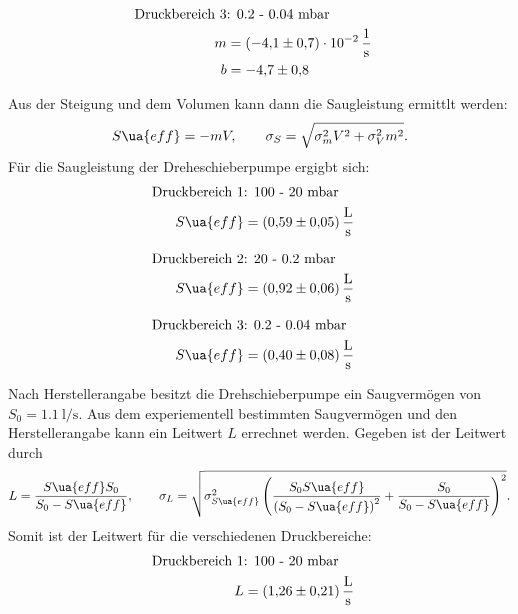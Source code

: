 \begin{align}
  \label{eq: regression_dreh_druck_3}
  \begin{aligned}
  \text{Druckbereich 3} &\text{: 0.2 - 0.04 mbar}& \\
  m&=\SI{-4.1\pm0.7 e-2}{\per\second} \\
  b&=\num{-4.7 \pm0.8 }
\end{aligned}
\end{align}

Aus der Steigung und dem Volumen kann dann die Saugleistung ermittlt werden:
\begin{equation}
  \label{eq: saug_druck}
  S\ua{eff}=-mV, \qquad \sigma_{S}=\sqrt{\sigma_{m}^{2} V^{2} + \sigma_{V}^{2} m^{2}}.
\end{equation}
Für die Saugleistung der Dreheschieberpumpe ergigbt sich:
\begin{align}
  \label{eq:dreh_saug_1}
  \begin{aligned}
  \text{Druckbereich 1} &\text{: 100 - 20 mbar}& \\
   S\ua{eff}&=\SI{0.59\pm 0.05}{\litre\per\second}
\end{aligned}
\end{align}

\begin{align}
  \label{eq:dreh_saug_2}
  \begin{aligned}
  \text{Druckbereich 2} &\text{: 20 - 0.2 mbar}& \\
   S\ua{eff}&=\SI{0.92\pm 0.06}{\litre\per\second}
\end{aligned}
\end{align}

\begin{align}
  \label{eq:dreh_saug_3}
  \begin{aligned}
  \text{Druckbereich 3} &\text{: 0.2 - 0.04 mbar}& \\
   S\ua{eff}&=\SI{0.40\pm 0.08}{\litre\per\second}
\end{aligned}
\end{align}

Nach Herstellerangabe besitzt die Drehschieberpumpe ein Saugvermögen von $S_0=\SI{1.1}{\litre\per\second}$.
Aus dem experiementell bestimmten Saugvermögen und den Herstellerangabe kann ein Leitwert $L$ errechnet werden.
Gegeben ist der Leitwert durch
\begin{equation}
  \label{eq: leitwert}
  L=\frac{S\ua{eff} S_0}{S_0-S\ua{eff}}, \qquad \sigma_L=\sqrt{ \sigma_{S\ua{eff}}^{2} \left(\frac{S_{0} S\ua{eff}}{\left(S_{0} - S\ua{eff}\right)^{2}} + \frac{S_{0}}{S_{0} - S\ua{eff}}\right)^{2}}.
\end{equation}
Somit ist der Leitwert für die verschiedenen Druckbereiche:
\begin{align}
  \label{eq:dreh_leit_1}
  \begin{aligned}
  \text{Druckbereich 1} &\text{: 100 - 20 mbar}& \\
   L&=\SI{1.26\pm 0.21}{\litre\per\second}
\end{aligned}
\end{align}

